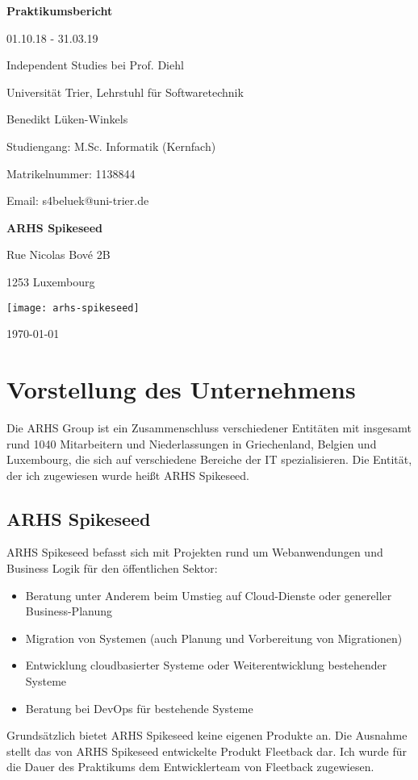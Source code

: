 \documentclass[a4paper, 11pt]{article}
\begin{document}
\begin{titlepage}
  \centering
  {\huge\textbf{Praktikumsbericht}\par}
  {01.10.18 - 31.03.19\par}  
  {\large Independent Studies bei Prof. Diehl \par}
  {\large Universität Trier, Lehrstuhl für Softwaretechnik \par}
  \vspace{2cm}
  {\large Benedikt Lüken-Winkels \par}
  {Studiengang: M.Sc. Informatik (Kernfach)\par}
  {Matrikelnummer: 1138844 \par}
  {Email: s4beluek@uni-trier.de \par}
  \vspace{2cm}
  \begin{minipage}[left]{0.49\textwidth}
  \begin{flushright}
  {\large \textbf{ARHS Spikeseed} \par}
  {Rue Nicolas Bové 2B\par}
  {1253 Luxembourg\par}
  \end{flushright}
  \end{minipage}
  \begin{minipage}[right]{0.49\textwidth}
  \texttt{[image: arhs-spikeseed]}
  \end{minipage}
  \vfill
  \today
\end{titlepage}




\newpage
\tableofcontents
\newpage
\section{Vorstellung des Unternehmens}
Die ARHS Group ist ein Zusammenschluss verschiedener Entitäten mit insgesamt rund 1040 Mitarbeitern und Niederlassungen in Griechenland, Belgien und Luxembourg, die sich auf verschiedene Bereiche der IT spezialisieren. Die Entität, der ich zugewiesen wurde heißt ARHS Spikeseed. 
\subsection{ARHS Spikeseed}
ARHS Spikeseed befasst sich mit Projekten rund um Webanwendungen und Business Logik für den öffentlichen Sektor:
\begin{itemize}
    \item Beratung unter Anderem beim Umstieg auf Cloud-Dienste oder genereller Business-Planung
    \item Migration von Systemen (auch Planung und Vorbereitung von Migrationen)
    \item Entwicklung cloudbasierter Systeme oder Weiterentwicklung bestehender Systeme
    \item Beratung bei DevOps für bestehende Systeme
\end{itemize}
Grundsätzlich bietet ARHS Spikeseed keine eigenen Produkte an. Die Ausnahme stellt das von ARHS Spikeseed entwickelte Produkt Fleetback dar. Ich wurde für die Dauer des Praktikums dem Entwicklerteam von Fleetback zugewiesen.
\end{document}
